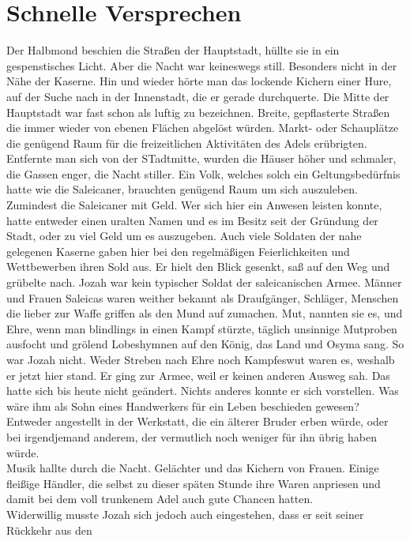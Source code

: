 \chapter{Schnelle Versprechen}


Der Halbmond beschien die Straßen der Hauptstadt, hüllte sie in ein gespenstisches Licht. Aber die 
Nacht war keineswegs still. Besonders nicht in der Nähe der Kaserne. Hin und wieder hörte man das 
lockende Kichern einer Hure, auf der Suche nach in der Innenstadt, die er gerade durchquerte. Die 
Mitte der Hauptstadt war fast schon als luftig zu bezeichnen. Breite, gepflasterte Straßen die 
immer wieder von ebenen Flächen abgelöst würden. Markt- oder Schauplätze die genügend Raum für die 
freizeitlichen Aktivitäten des Adels erübrigten. Entfernte man sich von der STadtmitte, wurden die 
Häuser höher und schmaler, die Gassen enger, die Nacht stiller. Ein Volk, welches solch ein 
Geltungsbedürfnis hatte wie die Saleicaner, brauchten genügend Raum um sich auszuleben. Zumindest 
die Saleicaner mit Geld. Wer sich hier ein Anwesen leisten konnte, hatte entweder einen uralten 
Namen und es im Besitz seit der Gründung der Stadt, oder zu viel Geld um es auszugeben. Auch viele 
Soldaten der nahe gelegenen Kaserne gaben hier bei den regelmäßigen Feierlichkeiten und 
Wettbewerben ihren Sold aus. 
Er hielt den Blick gesenkt, saß auf den Weg und grübelte nach. Jozah war kein typischer Soldat der 
saleicanischen Armee. Männer und Frauen Saleicas waren weither bekannt als Draufgänger, Schläger, 
Menschen die lieber zur Waffe griffen als den Mund auf zumachen. Mut, nannten sie es, und Ehre, 
wenn man blindlings in einen Kampf stürzte, täglich unsinnige Mutproben ausfocht und grölend 
Lobeshymnen auf den König, das Land und Osyma sang. So war Jozah nicht. Weder Streben nach Ehre 
noch Kampfeswut waren es, weshalb er jetzt hier stand. Er ging zur Armee, weil er keinen anderen 
Ausweg sah. Das hatte sich bis heute nicht geändert. Nichts anderes konnte er sich vorstellen. Was 
wäre ihm als Sohn eines Handwerkers für ein Leben beschieden gewesen? Entweder angestellt in der 
Werkstatt, die ein älterer Bruder erben würde, oder bei irgendjemand anderem, der vermutlich noch 
weniger für ihn übrig haben würde. \\
Musik hallte durch die Nacht. Gelächter und das Kichern von Frauen. Einige fleißige Händler, die 
selbst zu dieser späten Stunde ihre Waren anpriesen und damit bei dem voll trunkenem Adel auch gute 
Chancen hatten.\\
Widerwillig musste Jozah sich jedoch auch eingestehen, dass er seit seiner Rückkehr aus den 
